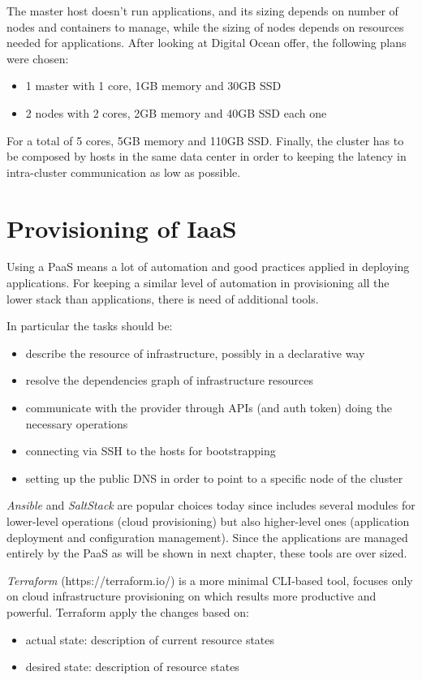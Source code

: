 The master host doesn't run applications, and its sizing depends on number of nodes and containers to manage, while the sizing of nodes depends on  resources needed for applications.  After looking at Digital Ocean offer, the following plans were chosen:

\begin{itemize}
\item 1 master with 1 core, 1GB memory and 30GB SSD
\item 2 nodes with 2 cores, 2GB memory and 40GB SSD each one
\end{itemize}

For a total of 5 cores, 5GB memory and 110GB SSD.  Finally, the cluster has to be composed by hosts in the same data center in order to keeping the latency in intra-cluster communication as low as possible.

\section{Provisioning of IaaS}\label{provisioning-of-iaas}

Using a PaaS means a lot of automation and good practices applied in deploying applications.  For keeping a similar level of automation in provisioning all the lower stack than applications, there is need of additional tools.

In particular the tasks should be:
\begin{itemize}
\item describe the resource of infrastructure, possibly in a declarative way
\item resolve the dependencies graph of infrastructure resources
\item communicate with the provider through APIs (and auth token) doing the necessary operations
\item connecting via SSH to the hosts for bootstrapping
\item setting up the public DNS in order to point to a specific node of the cluster
\end{itemize}

\textit{Ansible} and \textit{SaltStack} are popular choices today since includes several modules for lower-level operations (cloud provisioning) but also higher-level ones (application deployment and configuration management).  Since the applications are managed entirely by the PaaS as will be shown in next chapter, these tools are over sized.

\textit{Terraform} (https://terraform.io/) is a more minimal CLI-based tool, focuses only on cloud infrastructure provisioning on which results more productive and powerful.  Terraform apply the changes based on:
\begin{itemize}
\item actual state:  description of current resource states
\item desired state:  description of resource states
\end{itemize}

